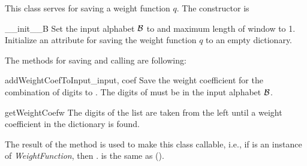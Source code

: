 This class serves for saving a weight function $q$. The constructor is

\begin{method}{\_\_init\_\_}{B}
Set the input alphabet $\mathcal{B}$ to  and maximum length of window to 1. Initialize an attribute  for saving the weight function $q$ to an empty dictionary. 
\end{method}

The methods for saving and calling are following:

\begin{method}{addWeightCoefToInput}{\_input, coef}
Save the weight coefficient  for the combination of digits  to . The digits of  must be in the input alphabet $\mathcal{B}$.
\end{method}

\begin{method}{getWeightCoef}{w}
The digits of the list  are taken from the left until a weight coefficient in the dictionary  is found. 
\end{method}

The result of the method  is used to make this class callable, i.e., if  is an instance of \emph{WeightFunction}, then . is the same as ().




